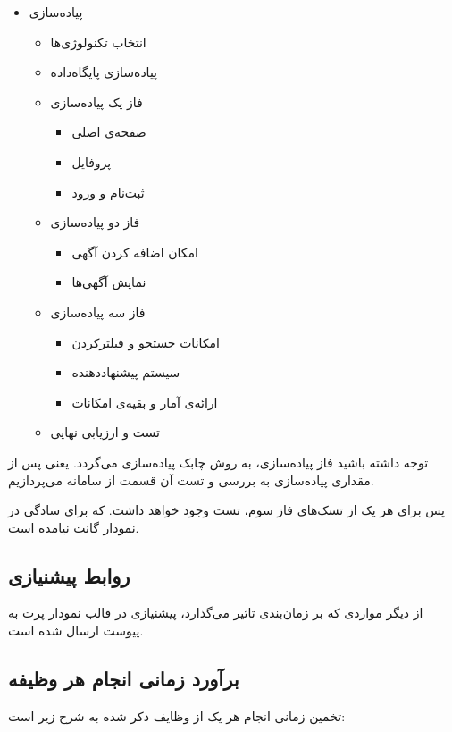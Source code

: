 \begin{itemize}
\begin{itemize}
	\end{itemize}
	\item
	پیاده‌سازی
	\begin{itemize}
		\item
		انتخاب تکنولوژی‌ها
		\item
		پیاده‌سازی پایگاه‌داده
		\item
		فاز یک پیاده‌سازی
		\begin{itemize}
			\item
			صفحه‌ی اصلی
			\item
			پروفایل
			\item
			ثبت‌نام و ورود
		\end{itemize}
		\item
		فاز دو پیاده‌سازی
		\begin{itemize}
			\item
			امکان اضافه کردن آگهی
			\item
			نمایش آگهی‌ها
		\end{itemize}
		\item
		فاز سه پیاده‌سازی
		\begin{itemize}
			\item
			امکانات جستجو و فیلترکردن
			\item
			سیستم پیشنهاددهنده
			\item
			ارائه‌ی آمار و بقیه‌ی امکانات
		\end{itemize}
		
		\item 
		تست و ارزیابی نهایی
		
	\end{itemize}
\end{itemize}

توجه داشته باشید فاز پیاده‌سازی، به روش چابک پیاده‌سازی می‌گردد. یعنی پس از مقداری پیاده‌سازی به بررسی و تست آن قسمت از سامانه می‌پردازیم.

پس برای هر یک از تسک‌های فاز سوم، تست وجود خواهد داشت. که برای سادگی در نمودار گانت نیامده است.



\subsection{روابط پیشنیازی}
از دیگر مواردی که بر زمان‌بندی تاثیر می‌گذارد، پیشنیازی در قالب نمودار پرت
به پیوست ارسال شده است.

\subsection{برآورد زمانی انجام هر وظیفه}
تخمین زمانی انجام هر یک از وظایف ذکر شده به شرح زیر است:


